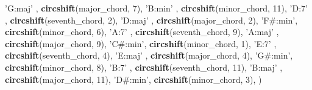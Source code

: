 \documentclass[]{article}
\newenvironment{Shaded}{\begin{snugshade}}{\end{snugshade}}
\newcommand{\DecValTok}[1]{\textcolor[rgb]{0.00,0.00,0.81}{#1}}
\newcommand{\KeywordTok}[1]{\textcolor[rgb]{0.13,0.29,0.53}{\textbf{#1}}}
\newcommand{\NormalTok}[1]{#1}
\newcommand{\StringTok}[1]{\textcolor[rgb]{0.31,0.60,0.02}{#1}}
\begin{document}
\begin{Shaded}
\begin{Highlighting}[]
        \StringTok{'G:maj'}\NormalTok{ , }\KeywordTok{circshift}\NormalTok{(major_chord,    }\DecValTok{7}\NormalTok{),}
        \StringTok{'B:min'}\NormalTok{ , }\KeywordTok{circshift}\NormalTok{(minor_chord,   }\DecValTok{11}\NormalTok{),}
        \StringTok{'D:7'}\NormalTok{   , }\KeywordTok{circshift}\NormalTok{(seventh_chord,  }\DecValTok{2}\NormalTok{),}
        \StringTok{'D:maj'}\NormalTok{ , }\KeywordTok{circshift}\NormalTok{(major_chord,    }\DecValTok{2}\NormalTok{),}
        \StringTok{'F#:min'}\NormalTok{, }\KeywordTok{circshift}\NormalTok{(minor_chord,    }\DecValTok{6}\NormalTok{),}
        \StringTok{'A:7'}\NormalTok{   , }\KeywordTok{circshift}\NormalTok{(seventh_chord,  }\DecValTok{9}\NormalTok{),}
        \StringTok{'A:maj'}\NormalTok{ , }\KeywordTok{circshift}\NormalTok{(major_chord,    }\DecValTok{9}\NormalTok{),}
        \StringTok{'C#:min'}\NormalTok{, }\KeywordTok{circshift}\NormalTok{(minor_chord,    }\DecValTok{1}\NormalTok{),}
        \StringTok{'E:7'}\NormalTok{   , }\KeywordTok{circshift}\NormalTok{(seventh_chord,  }\DecValTok{4}\NormalTok{),}
        \StringTok{'E:maj'}\NormalTok{ , }\KeywordTok{circshift}\NormalTok{(major_chord,    }\DecValTok{4}\NormalTok{),}
        \StringTok{'G#:min'}\NormalTok{, }\KeywordTok{circshift}\NormalTok{(minor_chord,    }\DecValTok{8}\NormalTok{),}
        \StringTok{'B:7'}\NormalTok{   , }\KeywordTok{circshift}\NormalTok{(seventh_chord, }\DecValTok{11}\NormalTok{),}
        \StringTok{'B:maj'}\NormalTok{ , }\KeywordTok{circshift}\NormalTok{(major_chord,   }\DecValTok{11}\NormalTok{),}
        \StringTok{'D#:min'}\NormalTok{, }\KeywordTok{circshift}\NormalTok{(minor_chord,    }\DecValTok{3}\NormalTok{),}
\NormalTok{)}


\end{Highlighting}
\end{Shaded}
\end{document}
